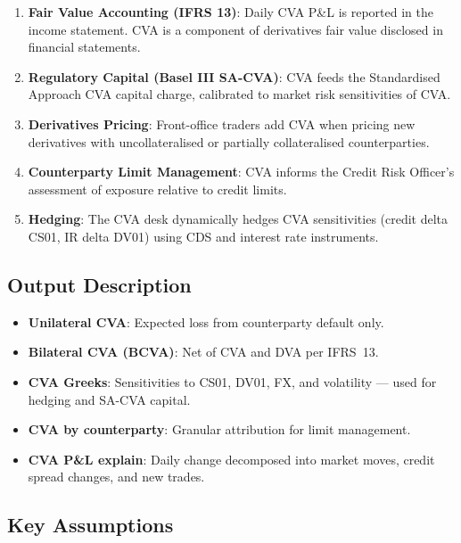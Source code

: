 \documentclass[11pt,a4paper]{article}
\begin{document}
\begin{enumerate}[noitemsep]
  \item \textbf{Fair Value Accounting (IFRS 13)}: Daily CVA P\&L is reported
        in the income statement. CVA is a component of derivatives fair value
        disclosed in financial statements.
  \item \textbf{Regulatory Capital (Basel III SA-CVA)}: CVA feeds the
        Standardised Approach CVA capital charge, calibrated to market risk
        sensitivities of CVA.
  \item \textbf{Derivatives Pricing}: Front-office traders add CVA when
        pricing new derivatives with uncollateralised or partially
        collateralised counterparties.
  \item \textbf{Counterparty Limit Management}: CVA informs the Credit Risk
        Officer's assessment of exposure relative to credit limits.
  \item \textbf{Hedging}: The CVA desk dynamically hedges CVA sensitivities
        (credit delta CS01, IR delta DV01) using CDS and interest rate
        instruments.
\end{enumerate}

\subsection{Output Description}

\begin{itemize}[noitemsep]
  \item \textbf{Unilateral CVA}: Expected loss from counterparty default only.
  \item \textbf{Bilateral CVA (BCVA)}: Net of CVA and DVA per IFRS~13.
  \item \textbf{CVA Greeks}: Sensitivities to CS01, DV01, FX, and
        volatility --- used for hedging and SA-CVA capital.
  \item \textbf{CVA by counterparty}: Granular attribution for limit
        management.
  \item \textbf{CVA P\&L explain}: Daily change decomposed into market moves,
        credit spread changes, and new trades.
\end{itemize}

\subsection{Key Assumptions}
\end{document}
